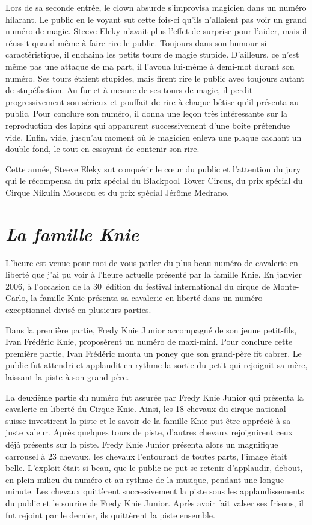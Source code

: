 Lors de sa seconde entrée, le clown absurde s’improvisa magicien dans un numéro hilarant. Le public en le voyant sut cette fois-ci qu'ils n’allaient pas voir un grand numéro de magie. Steeve Eleky n’avait plus l’effet de surprise pour l’aider, mais il réussit quand même à faire rire le public. Toujours dans son humour si caractéristique, il enchaina les petits tours de magie stupide. D’ailleurs, ce n’est même pas une attaque de ma part, il l’avoua lui-même à demi-mot durant son numéro. Ses tours étaient stupides, mais firent rire le public avec toujours autant de stupéfaction. Au fur et à mesure de ses tours de magie, il perdit progressivement son sérieux et pouffait de rire à chaque bêtise qu’il présenta au public. Pour conclure son numéro, il donna une leçon très intéressante sur la reproduction des lapins qui apparurent successivement d’une boite prétendue vide. Enfin, vide, jusqu’au moment où le magicien enleva une plaque cachant un double-fond, le tout en essayant de contenir son rire.

Cette année, Steeve Eleky sut conquérir le cœur du public et l’attention du jury qui le récompensa du prix spécial du Blackpool Tower Circus, du prix spécial du Cirque Nikulin Mouscou et du prix spécial Jérôme Medrano. 

\section*{\textit{La famille Knie}}
{}
\noindent
L’heure est venue pour moi de vous parler du plus beau numéro de cavalerie en liberté que j’ai pu voir à l’heure actuelle présenté par la famille Knie. En janvier 2006, à l’occasion de la 30\ieme~édition du festival international du cirque de Monte-Carlo, la famille Knie présenta sa cavalerie en liberté dans un numéro exceptionnel divisé en plusieurs parties. 

Dans la première partie, Fredy Knie Junior accompagné de son jeune petit-fils, Ivan Frédéric Knie, proposèrent un numéro de maxi-mini. Pour conclure cette première partie, Ivan Frédéric monta un poney que son grand-père fit cabrer. Le public fut attendri et applaudit en rythme la sortie du petit qui rejoignit sa mère, laissant la piste à son grand-père. 

La deuxième partie du numéro fut assurée par Fredy Knie Junior qui présenta la cavalerie en liberté du Cirque Knie. Ainsi, les 18 chevaux du cirque national suisse investirent la piste et le savoir de la famille Knie put être apprécié à sa juste valeur. Après quelques tours de piste, d’autres chevaux rejoignirent ceux déjà présents sur la piste. Fredy Knie Junior présenta alors un magnifique carrousel à 23 chevaux, les chevaux l’entourant de toutes parts, l’image était belle. L’exploit était si beau, que le public ne put se retenir d’applaudir, debout, en plein milieu du numéro et au rythme de la musique, pendant une longue minute. Les chevaux quittèrent successivement la piste sous les applaudissements du public et le sourire de Fredy Knie Junior. Après avoir fait valser ses frisons, il fut rejoint par le dernier, ils quittèrent la piste ensemble.


